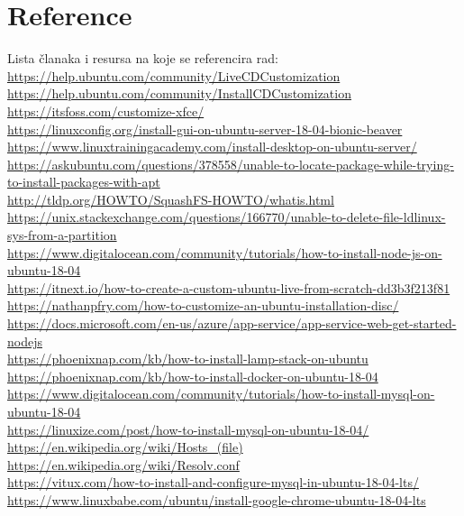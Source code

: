 \documentclass[12pt,vi]{mitthesis}
\begin{document}
\chapter*{Reference}
\indent
Lista članaka i resursa na koje se referencira rad:\\
\url{https://help.ubuntu.com/community/LiveCDCustomization}\\
\url{https://help.ubuntu.com/community/InstallCDCustomization}\\
\url{https://itsfoss.com/customize-xfce/}\\
\url{https://linuxconfig.org/install-gui-on-ubuntu-server-18-04-bionic-beaver}\\
\url{https://www.linuxtrainingacademy.com/install-desktop-on-ubuntu-server/}\\
\url{https://askubuntu.com/questions/378558/unable-to-locate-package-while-trying-to-install-packages-with-apt}\\
\url{http://tldp.org/HOWTO/SquashFS-HOWTO/whatis.html}\\
\url{https://unix.stackexchange.com/questions/166770/unable-to-delete-file-ldlinux-sys-from-a-partition}\\
\url{https://www.digitalocean.com/community/tutorials/how-to-install-node-js-on-ubuntu-18-04}\\
\url{https://itnext.io/how-to-create-a-custom-ubuntu-live-from-scratch-dd3b3f213f81}\\
\url{https://nathanpfry.com/how-to-customize-an-ubuntu-installation-disc/}\\
\url{https://docs.microsoft.com/en-us/azure/app-service/app-service-web-get-started-nodejs}\\
\url{https://phoenixnap.com/kb/how-to-install-lamp-stack-on-ubuntu}\\
\url{https://phoenixnap.com/kb/how-to-install-docker-on-ubuntu-18-04}\\
\url{https://www.digitalocean.com/community/tutorials/how-to-install-mysql-on-ubuntu-18-04}\\
\url{https://linuxize.com/post/how-to-install-mysql-on-ubuntu-18-04/}\\
\url{https://en.wikipedia.org/wiki/Hosts_(file)}\\
\url{https://en.wikipedia.org/wiki/Resolv.conf}\\
\url{https://vitux.com/how-to-install-and-configure-mysql-in-ubuntu-18-04-lts/}\\
\url{https://www.linuxbabe.com/ubuntu/install-google-chrome-ubuntu-18-04-lts}\\
\end{document}
